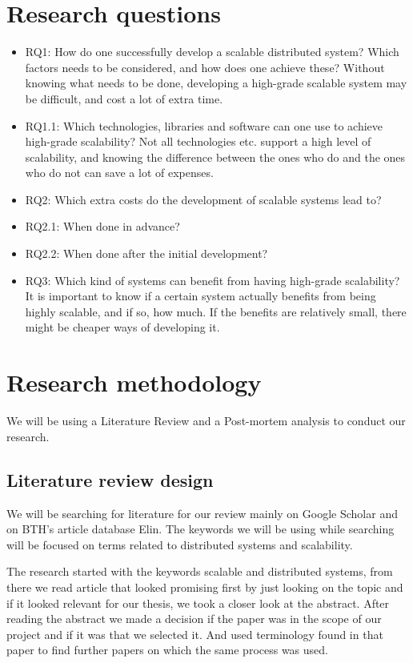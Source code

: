 \documentclass{article}
\begin{document}
\newpage

\section{Research questions}
\begin{itemize}
\item{RQ1: How do one successfully develop a scalable distributed system? Which
factors needs to be considered, and how does one achieve these? Without knowing
what needs to be done, developing a high-grade scalable system may be
difficult, and cost a lot of extra time.} 

\item{RQ1.1: Which technologies, libraries and software can one use to achieve
high-grade scalability? Not all technologies etc. support a high level of
scalability, and knowing the difference between the ones who do and the ones
who do not can save a lot of expenses.}

\item{RQ2: Which extra costs do the development of scalable systems lead to?} 
\item{RQ2.1: When done in advance?} 
\item{RQ2.2: When done after the initial development?} 

\item{RQ3: Which kind of systems can benefit from having high-grade scalability?
It is important to know if a certain system actually benefits from being highly
scalable, and if so, how much. If the benefits are relatively small, there 
might be cheaper ways of developing it.}


\end{itemize}

\section{Research methodology}
We will be using a Literature Review and a Post-mortem analysis to conduct our 
research. 

\subsection{Literature review design}
We will be searching for literature for our review mainly on Google Scholar and
on BTH's article database Elin. The keywords we will be using while searching 
will be focused on terms related to distributed systems and scalability.

The research started with the keywords scalable and distributed systems,
from there we read article that looked promising first by just looking on
the topic and if it looked relevant for our thesis, we took a closer look
at the abstract. After reading the abstract we made a decision if the paper
was in the scope of our project and if it was that we selected it. And used
terminology found in that paper to find further papers on which the same 
process was used. 
\newline
\end{document}
